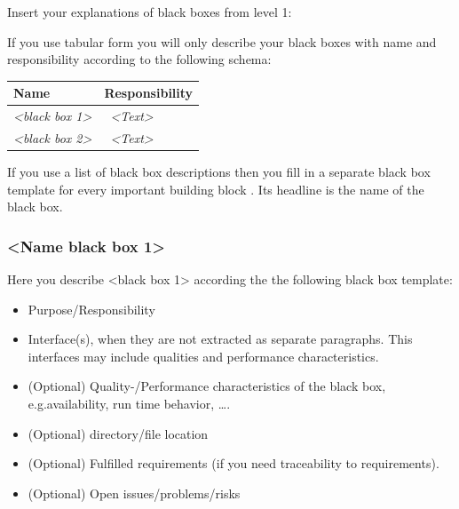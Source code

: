 \documentclass[]{article}
\begin{document}
Insert your explanations of black boxes from level 1:

If you use tabular form you will only describe your black boxes with
name and responsibility according to the following schema:

\begin{longtable}[]{@{}ll@{}}
\toprule
\begin{minipage}[b]{0.31\columnwidth}\raggedright
\textbf{Name}\strut
\end{minipage} & \begin{minipage}[b]{0.63\columnwidth}\raggedright
\textbf{Responsibility}\strut
\end{minipage}\tabularnewline
\midrule
\endhead
\begin{minipage}[t]{0.31\columnwidth}\raggedright
\emph{\textless{}black box 1\textgreater{}}\strut
\end{minipage} & \begin{minipage}[t]{0.63\columnwidth}\raggedright
~\emph{\textless{}Text\textgreater{}}\strut
\end{minipage}\tabularnewline
\begin{minipage}[t]{0.31\columnwidth}\raggedright
\emph{\textless{}black box 2\textgreater{}}\strut
\end{minipage} & \begin{minipage}[t]{0.63\columnwidth}\raggedright
~\emph{\textless{}Text\textgreater{}}\strut
\end{minipage}\tabularnewline
\bottomrule
\end{longtable}

If you use a list of black box descriptions then you fill in a separate
black box template for every important building block . Its headline is
the name of the black box.

\hypertarget{__name_black_box_1}{%
\subsubsection{\textless{}Name black box
1\textgreater{}}\label{__name_black_box_1}}

Here you describe \textless{}black box 1\textgreater{} according the the
following black box template:

\begin{itemize}
\item
  Purpose/Responsibility
\item
  Interface(s), when they are not extracted as separate paragraphs. This
  interfaces may include qualities and performance characteristics.
\item
  (Optional) Quality-/Performance characteristics of the black box,
  e.g.availability, run time behavior, \ldots{}.
\item
  (Optional) directory/file location
\item
  (Optional) Fulfilled requirements (if you need traceability to
  requirements).
\item
  (Optional) Open issues/problems/risks
\end{itemize}
\end{document}
